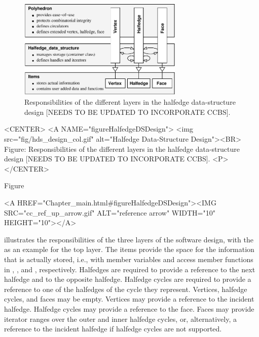 \begin{ccTexOnly}
  \begin{figure}
    \begin{center}
      \parbox{0.7\textwidth}{%
          \includegraphics[width=0.7\textwidth]{HalfedgeDS/fig/hds_design}%
      }
    \end{center}
    \caption{Responsibilities of the different layers in the 
             halfedge data-structure design [NEEDS TO BE UPDATED TO INCORPORATE CCBS].}
    \label{figureHalfedgeDSDesign}
  \end{figure}
\end{ccTexOnly}

\begin{ccHtmlOnly}
    <CENTER>
    <A NAME="figureHalfedgeDSDesign">
        <img src="fig/hds_design_col.gif"
         alt="Halfedge Data-Structure Design"><BR>
    Figure: Responsibilities of the different layers in the 
            halfedge data-structure design [NEEDS TO BE UPDATED TO INCORPORATE CCBS].
    <P>
    </CENTER>
\end{ccHtmlOnly}

Figure~\ccTexHtml{\ref{figureHalfedgeDSDesign}}{}\begin{ccHtmlOnly}
  <A HREF="Chapter_main.html#figureHalfedgeDSDesign"><IMG 
  SRC="cc_ref_up_arrow.gif" ALT="reference arrow" WIDTH="10" HEIGHT="10"></A>
\end{ccHtmlOnly}
illustrates the responsibilities of the three layers of the software
design, with the  as an example for the top
layer.  
{\XHDS
The items provide the space for the information that is
actually stored, i.e., with member variables and access member
functions in , ,  and
, respectively. Halfedges are required to provide a reference to the
next halfedge and to the opposite halfedge. Halfedge cycles
are required to provide a reference to one of the halfedges of the cycle
they represent.
Vertices, halfedge cycles, and faces may be empty.
Vertices may provide a reference to the incident halfedge.
Halfedge cycles may provide a reference to the face.
Faces may provide iterator ranges over the outer and inner halfedge cycles, or, 
alternatively, a reference to the incident halfedge if halfedge cycles are not supported.
}

